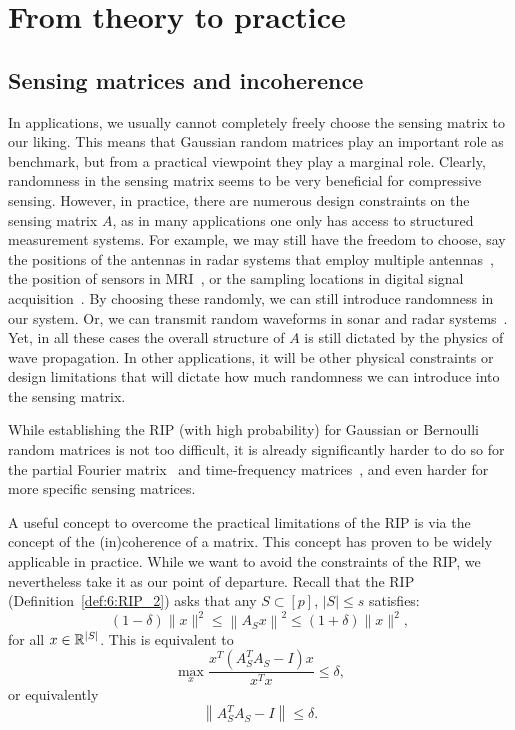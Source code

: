 \section{From theory to practice} \label{s:cs_practice0}


\subsection{Sensing matrices and incoherence}\label{s:coherence}

In applications, we usually cannot completely freely choose the sensing matrix to our liking. This means that Gaussian random matrices play an important role as benchmark, but from a practical viewpoint they play a marginal role. Clearly, randomness in the sensing matrix seems to be very beneficial for compressive sensing. However, in practice, there are numerous design constraints on the sensing matrix $A$, as in many applications one only has access to structured measurement systems. For example,  we may still have the freedom to choose, say the positions of the antennas in radar systems that employ multiple antennas~\cite{strohmer2014analysis,strohmer2013accurate}, the position of sensors in MRI~\cite{lustig2007sparse,Adcock-Hansen-book,block2007undersampled,ni2024auto}, or the sampling locations in digital signal acquisition~\cite{mishali2010theory}.
By choosing these randomly, we can still introduce randomness in our system. Or, we can transmit random waveforms in sonar and radar systems~\cite{herman2009high,potter2010sparsity}. Yet, in all these cases the overall structure of $A$ is still dictated by the physics of wave propagation. In other applications, it will be other physical constraints or design limitations that will dictate how much randomness we can introduce into the sensing matrix.

While establishing the RIP (with high probability) for Gaussian or Bernoulli random matrices is not too difficult, it is already significantly harder to do so for the partial Fourier matrix~\cite{Candes_CS4,rudelson2008sparse,Haviv_Regev_2016} and time-frequency matrices~\cite{dorsch2017refined}, and even harder for more specific sensing matrices.


A useful concept to overcome the practical limitations of the RIP is via the concept of the (in)coherence of a matrix. This concept has proven to be widely applicable in practice.
While we want to avoid the constraints of the RIP, we nevertheless take it as our point of departure.
Recall that the RIP (Definition~\ref{def:6:RIP_2}) asks that any $S\subset [p]$, $|S|\leq s$ satisfies:
\[
(1-\delta) \|x\|^2 \leq \left\| A_Sx\right\|^2 \leq (1+\delta) \|x\|^2,
\] 
for all $x\in \mathbb{R}^{|S|}$. This is equivalent to
\[
\max_x \frac{x^T\left( A_S^TA_S - I \right)x}{x^Tx} \leq \delta,
\]
or equivalently
\[
\left\| A_S^TA_S - I \right\| \leq \delta.
\]

